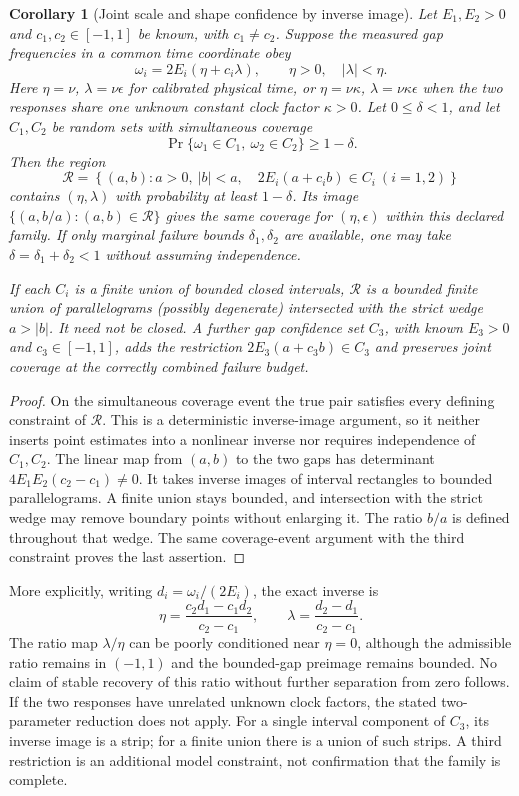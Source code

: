 \documentclass[11pt]{article}
\newtheorem{corollary}[theorem]{Corollary}
\theoremstyle{definition}
\begin{document}
\begin{corollary}[Joint scale and shape confidence by inverse image]
\label{cor:operational-joint-region}
Let $E_1,E_2>0$ and $c_1,c_2\in[-1,1]$ be known, with $c_1\ne c_2$.
Suppose the measured gap frequencies in a common time coordinate obey
\[
 \omega_i=2E_i(\eta+c_i\lambda),\qquad
 \eta>0,\quad |\lambda|<\eta .
\]
Here $\eta=\nu$, $\lambda=\nu\epsilon$ for calibrated physical time,
or $\eta=\nu\kappa$, $\lambda=\nu\kappa\epsilon$ when the two
responses share one unknown constant clock factor $\kappa>0$.
Let $0\le\delta<1$, and let $C_1,C_2$ be random sets with simultaneous coverage
\[
 \Pr\{\omega_1\in C_1,\ \omega_2\in C_2\}\ge1-\delta.
\]
Then the region
\begin{equation}
 \mathcal R=\left\{(a,b):a>0,\ |b|<a,\quad
       2E_i(a+c_i b)\in C_i\ (i=1,2)\right\}
 \label{eq:operational-joint-region}
\end{equation}
contains $(\eta,\lambda)$ with probability at least $1-\delta$.
Its image $\{(a,b/a):(a,b)\in\mathcal R\}$ gives the same coverage
for $(\eta,\epsilon)$ within this declared family. If only marginal
failure bounds $\delta_1,\delta_2$ are available, one may take
$\delta=\delta_1+\delta_2<1$ without assuming independence.

If each $C_i$ is a finite union of bounded closed intervals, $\mathcal R$
is a bounded finite union of parallelograms (possibly degenerate) intersected
with the strict wedge $a>|b|$. It need not be closed. A further gap
confidence set $C_3$, with known $E_3>0$ and $c_3\in[-1,1]$, adds the restriction
$2E_3(a+c_3b)\in C_3$ and preserves joint coverage at the correctly
combined failure budget.
\end{corollary}
\begin{proof}
On the simultaneous coverage event the true pair satisfies every defining
constraint of $\mathcal R$. This is a deterministic inverse-image argument,
so it neither inserts point estimates into a nonlinear inverse nor requires
independence of $C_1,C_2$. The linear map from $(a,b)$ to the two gaps has
determinant $4E_1E_2(c_2-c_1)\ne0$. It takes inverse images of interval
rectangles to bounded parallelograms. A finite union stays bounded, and
intersection with the strict wedge may remove boundary points without
enlarging it. The ratio $b/a$ is defined throughout that wedge. The same
coverage-event argument with the third constraint proves the last assertion.
\end{proof}

More explicitly, writing $d_i=\omega_i/(2E_i)$, the exact inverse is
\[
 \eta=\frac{c_2d_1-c_1d_2}{c_2-c_1},\qquad
 \lambda=\frac{d_2-d_1}{c_2-c_1}.
\]
The ratio map $\lambda/\eta$ can be poorly conditioned near $\eta=0$,
although the admissible ratio remains in $(-1,1)$ and the bounded-gap
preimage remains bounded. No claim of stable recovery of this ratio without
further separation from zero follows. If the two responses have unrelated
unknown clock factors, the stated two-parameter reduction does not apply.
For a single interval component of $C_3$, its inverse image is a strip;
for a finite union there is a union of such strips. A third restriction is
an additional model constraint, not confirmation that the family is complete.
\end{document}
